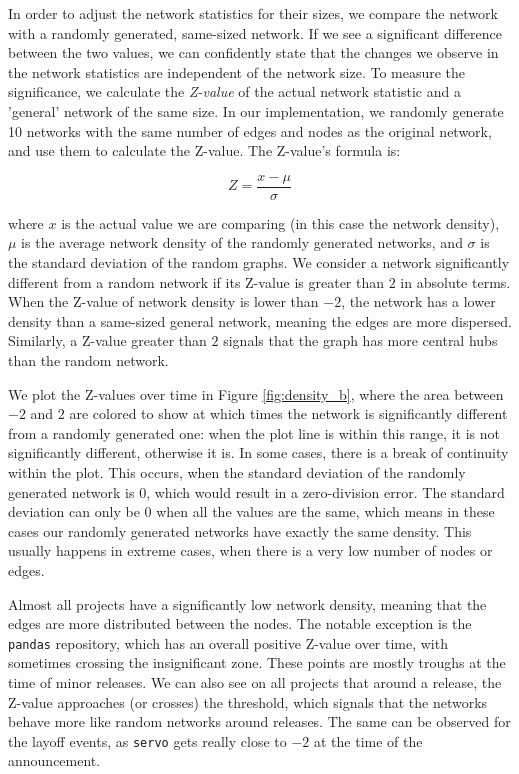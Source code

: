 In order to adjust the network statistics for their sizes, we compare the network with a randomly generated, same-sized network. If we see a significant difference between the two values, we can confidently state that the changes we observe in the network statistics are independent of the network size. To measure the significance, we calculate the \textit{Z-value} of the actual network statistic and a 'general' network of the same size. In our implementation, we randomly generate 10 networks with the same number of edges and nodes as the original network, and use them to calculate the Z-value. The Z-value's formula is:

\[ Z=\frac{x-\mu}{\sigma} \]

where $x$ is the actual value we are comparing (in this case the network density), $\mu$ is the average network density of the randomly generated networks, and $\sigma$ is the standard deviation of the random graphs. We consider a network significantly different from a random network if its Z-value is greater than $2$ in absolute terms. When the Z-value of network density is lower than $-2$, the network has a lower density than a same-sized general network, meaning the edges are more dispersed. Similarly, a Z-value greater than $2$ signals that the graph has more central hubs than the random network.

We plot the Z-values over time in Figure \ref{fig:density_b}, where the area between $-2$ and $2$ are colored to show at which times the network is significantly different from a randomly generated one: when the plot line is within this range, it is not significantly different, otherwise it is. In some cases, there is a break of continuity within the plot. This occurs, when the standard deviation of the randomly generated network is $0$, which would result in a zero-division error. The standard deviation can only be $0$ when all the values are the same, which means in these cases our randomly generated networks have exactly the same density. This usually happens in extreme cases, when there is a very low number of nodes or edges.
  
Almost all projects have a significantly low network density, meaning that the edges are more distributed between the nodes. The notable exception is the \texttt{pandas} repository, which has an overall positive Z-value over time, with sometimes crossing the insignificant zone. These points are mostly troughs at the time of minor releases. We can also see on all projects that around a release, the Z-value approaches (or crosses) the threshold, which signals that the networks behave more like random networks around releases. The same can be observed for the layoff events, as \texttt{servo} gets really close to $-2$ at the time of the announcement.

